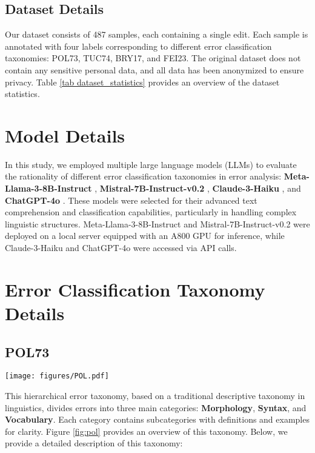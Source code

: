 \subsection{Dataset Details}
\label{appendix dataset_statistics}
Our dataset consists of 487 samples, each containing a single edit. Each sample is annotated with four labels corresponding to different error classification taxonomies: POL73, TUC74, BRY17, and FEI23. The original dataset does not contain any sensitive personal data, and all data has been anonymized to ensure privacy. Table \ref{tab dataset_statistics} provides an overview of the dataset statistics.

\section{Model Details}
\label{appendix models}
In this study, we employed multiple large language models (LLMs) to evaluate the rationality of different error classification taxonomies in error analysis: \textbf{Meta-Llama-3-8B-Instruct} \citep{llama3modelcard}, \textbf{Mistral-7B-Instruct-v0.2} \citep{mistral7b}, \textbf{Claude-3-Haiku} \citep{claude3}, and \textbf{ChatGPT-4o} \citep{chatgpt4o}. These models were selected for their advanced text comprehension and classification capabilities, particularly in handling complex linguistic structures. Meta-Llama-3-8B-Instruct and Mistral-7B-Instruct-v0.2 were deployed on a local server equipped with an A800 GPU for inference, while Claude-3-Haiku and ChatGPT-4o were accessed via API calls.

\section{Error Classification Taxonomy Details}
\label{appendix taxonomy}
\subsection{POL73}
\label{subsec: linguistic one}
\begin{figure*}[htbp]
    \centering
    \texttt{[image: figures/POL.pdf]}
    \caption{Overview of the POL73 Error Classification Taxonomy. The vertical ellipsis indicates that the category has additional subcategories not fully expanded here.}
    \label{fig:pol}
\end{figure*}

This hierarchical error taxonomy, based on a traditional descriptive taxonomy in linguistics, divides errors into three main categories: \textbf{Morphology}, \textbf{Syntax}, and \textbf{Vocabulary}.
Each category contains subcategories with definitions and examples for clarity. Figure \ref{fig:pol} provides an overview of this taxonomy. Below, we provide a detailed description of this taxonomy:

